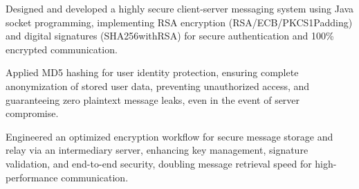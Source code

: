 \vspace{4pt}
\begin{tightemize}
    \item Designed and developed a highly secure client-server messaging system using Java socket programming, implementing RSA encryption (RSA/ECB/PKCS1Padding) and digital signatures (SHA256withRSA) for secure authentication and 100\% encrypted communication.
    \item Applied MD5 hashing for user identity protection, ensuring complete anonymization of stored user data, preventing unauthorized access, and guaranteeing zero plaintext message leaks, even in the event of server compromise.
    \item Engineered an optimized encryption workflow for secure message storage and relay via an intermediary server, enhancing key management, signature validation, and end-to-end security, doubling message retrieval speed for high-performance communication.
\end{tightemize}
